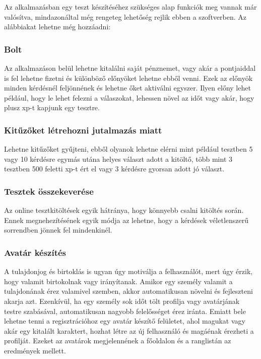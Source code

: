 


Az alkalmazásban egy teszt készítéséhez szükséges alap funkciók meg vannak már valósítva, mindazonáltal még rengeteg lehetőség rejlik ebben a szoftverben. Az alábbiakat lehetne még hozzáadni:

\subsubsection{Bolt}
Az alkalmazáson belül lehetne kitalálni saját pénznemet, vagy akár a pontjaiddal is fel lehetne fizetni és különböző előnyöket lehetne ebből venni. Ezek az előnyök minden kérdésnél feljönnének és lehetne őket aktiválni egyszer. Ilyen előny lehet például, hogy le lehet felezni a válaszokat, lehessen növel az időt vagy akár, hogy plusz xp-t kapjunk egy tesztre.

\subsubsection{Kitűzőket létrehozni jutalmazás miatt}
Lehetne kitűzőket gyűjteni, ebből olyanok lehetne elérni mint például tesztben 5 vagy 10 kérdésre egymás utána helyes választ adott a kitöltő, több mint 3 tesztben 500 feletti xp-t ért el vagy 3 kérdésre gyorsan adott jó választ.

\subsubsection{Tesztek összekeverése}
Az online tesztkitöltések egyik hátránya, hogy könnyebb csalni kitöltés során. Ennek megnehezítésének egyik módja az lehetne, hogy a kérdések véletlenszerű sorrendben jönnek fel mindenkinél.

\subsubsection{Avatár készítés}
A tulajdonjog és birtoklás is ugyan úgy motiválja a felhasználót, mert úgy érzik, hogy valamit birtokolnak vagy irányítanak. Amikor egy személy valamit a tulajdonának érez valamivel szemben, akkor automatikusan növelni és fejleszteni akarja azt. Ezenkívül, ha egy személy sok időt tölt profilja vagy avatárjának testre szabásával, automatikusan nagyobb felelősséget érez iránta. Emiatt bele lehetne tenni a regisztrációhoz egy avatár készítő felületet, ahol magukat vagy akár egy kitalált karaktert, hozhat létre az új felhasználó és magáénak érezheti a profilját. Ezeket az avatárok megjelennének a főoldalon és a ranglistán az eredmények mellett.

